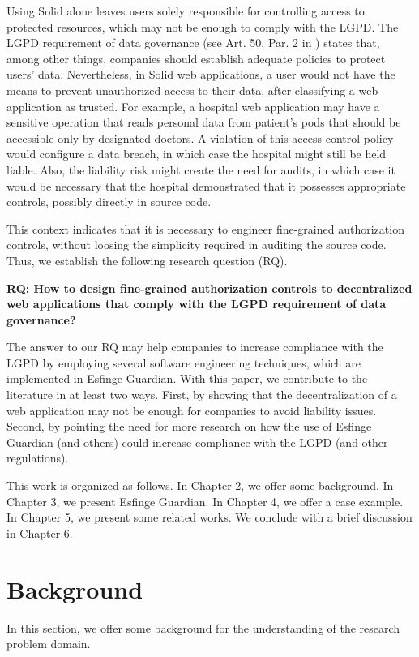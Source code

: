 \documentclass[sigconf]{acmart}
\begin{document}
Using Solid alone leaves users solely responsible for controlling access to protected resources, which may not be enough to comply with the LGPD. The LGPD requirement of data governance (see Art. 50, Par. 2 in \cite{LGPD18}) states that, among other things, companies should establish adequate policies to protect users' data. Nevertheless, in Solid web applications, a user would not have the means to prevent unauthorized access to their data, after classifying a web application as trusted. For example, a hospital web application may have a sensitive operation that reads personal data from patient's pods that should be accessible only by designated doctors. A violation of this access control policy would configure a data breach, in which case the hospital might still be held liable. Also, the liability risk might create the need for audits, in which case it would be necessary that the hospital demonstrated that it possesses appropriate controls, possibly directly in source code.

This context indicates that it is necessary to engineer fine-grained authorization controls, without loosing the simplicity required in auditing the source code. Thus, we establish the following research question (RQ).

\noindent \textbf{RQ: How to design fine-grained authorization controls to decentralized web applications that comply with the LGPD requirement of data governance?}

The answer to our RQ may help companies to increase compliance with the LGPD by employing several software engineering techniques, which are implemented in Esfinge Guardian. With this paper, we contribute to the literature in at least two ways. First, by showing that the decentralization of a web application may not be enough for companies to avoid liability issues. Second, by pointing the need for more research on how the use of Esfinge Guardian (and others) could increase compliance with the LGPD (and other regulations).

This work is organized as follows. In Chapter 2, we offer some background. In Chapter 3, we present Esfinge Guardian. In Chapter 4, we offer a case example. In Chapter 5, we present some related works. We conclude with a brief discussion in Chapter 6.


\section{Background}
In this section, we offer some background for the understanding of the research problem domain.
\end{document}
